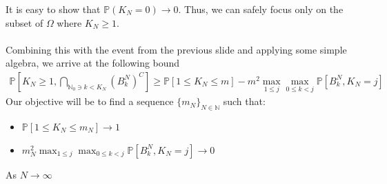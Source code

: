 \documentclass{beamer}
\begin{document}
\begin{frame}
    It is easy to show that $\mathbb{P}(K_N = 0) \rightarrow 0$. Thus, we can safely focus only on the subset of $\Omega$ where $K_N \geq 1$. \\~\\
    Combining this with the event from the previous slide and applying some simple algebra, we arrive at the following bound
    \small
    \begin{align*}
        \mathbb{P}\left[ K_N \geq 1,  \bigcap_{\mathbb{N}_0 \ni k < K_N}\left(B^N_k\right)^C \right]
        \geq  \mathbb{P}[1 \leq K_N \leq m] - m^2\max_{1 \leq j}\max_{0 \leq k < j}\mathbb{P}\left[ B^N_k, K_{N} = j \right]
    \end{align*}
    \normalsize
    Our objective will be to find a sequence $\{m_N\}_{N\in\mathbb{N}}$ such that:
    \begin{itemize}
        \item $\mathbb{P}[1 \leq K_N \leq m_N] \rightarrow 1$
        \item $m_N^2\max_{1 \leq j}\max_{0 \leq k < j}\mathbb{P}\left[ B^N_k, K_{N} = j \right] \rightarrow 0$ 
    \end{itemize}
    As $N \rightarrow \infty$

\end{frame}
\end{document}
